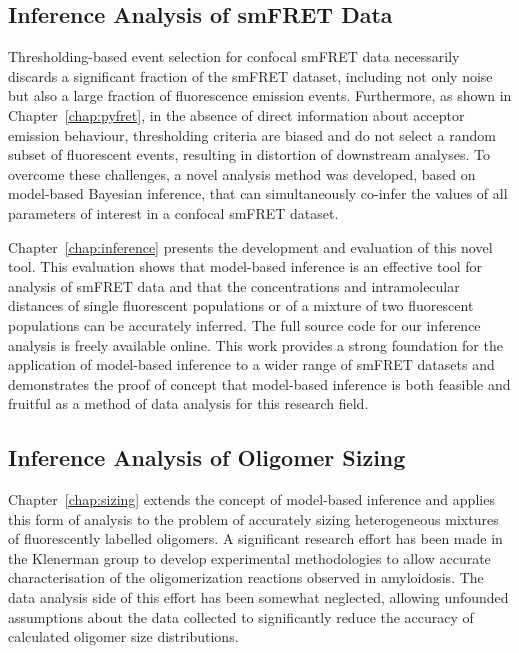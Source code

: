 \subsection{Inference Analysis of smFRET Data}
Thresholding-based event selection for confocal smFRET data necessarily discards a significant fraction of the smFRET dataset, including not only noise but also a large fraction of fluorescence emission events. Furthermore, as shown in Chapter~\ref{chap:pyfret}, in the absence of direct information about acceptor emission behaviour, thresholding criteria are biased and do not select a random subset of fluorescent events, resulting in distortion of downstream analyses. To overcome these challenges, a novel analysis method was developed, based on model-based Bayesian inference, that can simultaneously co-infer the values of all parameters of interest in a confocal smFRET dataset.

Chapter~\ref{chap:inference} presents the development and evaluation of this novel tool. This evaluation shows that model-based inference is an effective tool for analysis of smFRET data and that the concentrations and intramolecular distances of single fluorescent populations or of a mixture of two fluorescent populations can be accurately inferred. The full source code for our inference analysis is freely available online. This work provides a strong foundation for the application of model-based inference to a wider range of smFRET datasets and demonstrates the proof of concept that model-based inference is both feasible and fruitful as a method of data analysis for this research field.  

\subsection{Inference Analysis of Oligomer Sizing}
Chapter~\ref{chap:sizing} extends the concept of model-based inference and applies this form of analysis to the problem of accurately sizing heterogeneous mixtures of fluorescently labelled oligomers. A significant research effort has been made in the Klenerman group to develop experimental methodologies to allow accurate characterisation of the oligomerization reactions observed in amyloidosis. The data analysis side of this effort has been somewhat neglected, allowing unfounded assumptions about the data collected to significantly reduce the accuracy of calculated oligomer size distributions.

